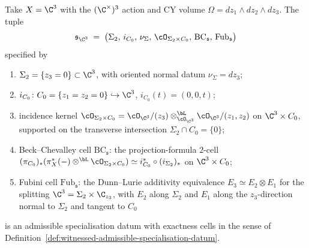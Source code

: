 \begin{lemma}
\label{lem:toric-witnessed-datum-c3}
Take $X = \C^3$ with the $(\C^\times)^3$ action and CY volume $\Omega = dz_1 \wedge dz_2 \wedge dz_3$. The tuple
\[
 \mathfrak s_{\C^3} \;=\; \bigl(\Sigma_2,\, i_{C_0},\, \nu_\Sigma,\, \cO_{\Sigma_2 \times C_0},\, \mathrm{BC}_{\mathfrak s},\, \mathrm{Fub}_{\mathfrak s}\bigr)
\]
specified by
\begin{enumerate}[label=\textup{(\roman*)}]
\item $\Sigma_2 = \{z_3 = 0\} \subset \C^3$, with oriented normal datum $\nu_\Sigma = dz_3$;
\item $i_{C_0} \colon C_0 = \{z_1 = z_2 = 0\} \hookrightarrow \C^3$, $i_{C_0}(t) = (0, 0, t)$;
\item incidence kernel $\cO_{\Sigma_2 \times C_0} = \cO_{\C^3} / (z_3) \otimes^{\bL}_{\cO_{\C^3}} \cO_{\C^3}/(z_1, z_2)$ on $\C^3 \times C_0$, supported on the transverse intersection $\Sigma_2 \cap C_0 = \{0\}$;
\item Beck--Chevalley cell $\mathrm{BC}_{\mathfrak s}$: the projection-formula $2$-cell
$(\pi_{C_0})_* (\pi_X^*(-) \otimes^{\bL} \cO_{\Sigma_2 \times C_0}) \simeq i_{C_0}^* \circ (i_{\Sigma_2})_*$ on $\C^3 \times C_0$;
\item Fubini cell $\mathrm{Fub}_{\mathfrak s}$: the Dunn--Lurie additivity equivalence $E_3 \simeq E_2 \otimes E_1$ for the splitting $\C^3 = \Sigma_2 \times \C_{z_3}$, with $E_2$ along $\Sigma_2$ and $E_1$ along the $z_3$-direction normal to $\Sigma_2$ and tangent to $C_0$
\end{enumerate}
is an admissible specialisation datum with exactness cells in the sense of Definition~\ref{def:witnessed-admissible-specialisation-datum}.
\end{lemma}

